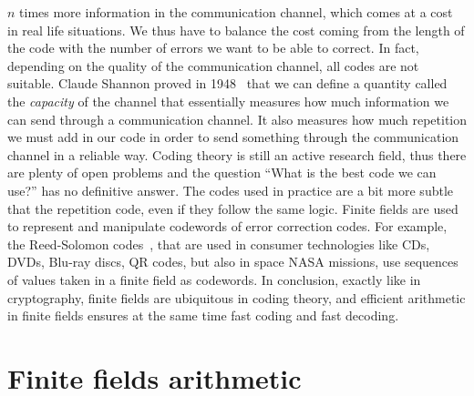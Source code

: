 $n$ times more information in the communication channel, which comes at a cost
in real life situations. We thus have to balance the cost coming from the length
of the code with the number of errors we want to be able to correct. In fact,
depending on the quality of the communication channel, all codes are not
suitable. Claude Shannon proved in
1948~\cite{Shannon48} that we can define a quantity called the \emph{capacity}
of the channel that essentially measures how much information we can send
through a communication channel. It also measures how much repetition we
must add in our code in order to send something through the communication
channel in a reliable way. Coding theory is still an active research field, thus
there are plenty of open problems and the question ``What is the best code we
can use?'' has no definitive answer. The codes used in practice
are a bit more subtle that the repetition code, even if they follow the same
logic. Finite fields are used to represent and manipulate codewords of error
correction codes. For example, the Reed-Solomon codes~\cite{RS60}, that are used
in consumer technologies like CDs, DVDs, Blu-ray discs, QR codes, but also in
space NASA missions, use sequences of values taken in a finite field as
codewords. In conclusion, exactly like in cryptography, finite fields are
ubiquitous in coding theory, and efficient arithmetic in finite fields ensures
at the same time fast coding and fast decoding.

\section{Finite fields arithmetic}

